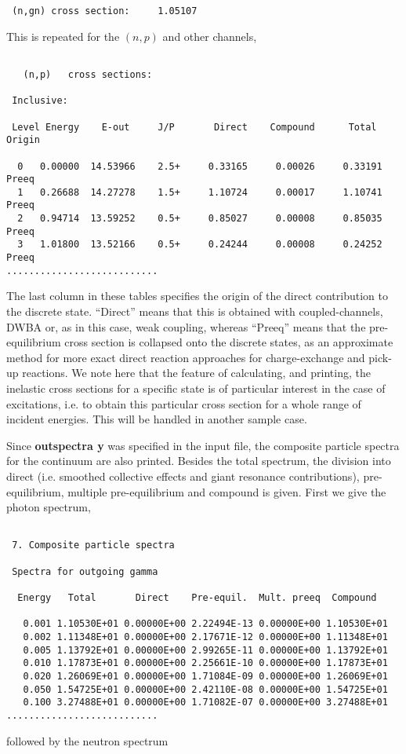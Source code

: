 \begin{samplecase}
{\begin{verbatim}
 (n,gn) cross section:     1.05107
\end{verbatim} } \renewcommand{\baselinestretch}{1.07}\small\normalsize
\noindent
This is repeated for the $(n,p)$ and other channels,

{\small \begin{verbatim}

   (n,p)   cross sections:

 Inclusive:

 Level Energy    E-out     J/P       Direct    Compound      Total     Origin

  0   0.00000  14.53966    2.5+     0.33165     0.00026     0.33191    Preeq
  1   0.26688  14.27278    1.5+     1.10724     0.00017     1.10741    Preeq
  2   0.94714  13.59252    0.5+     0.85027     0.00008     0.85035    Preeq
  3   1.01800  13.52166    0.5+     0.24244     0.00008     0.24252    Preeq
...........................
\end{verbatim} } \renewcommand{\baselinestretch}{1.07}\small\normalsize
\noindent
The last column in these tables specifies the origin of the direct contribution
to the discrete state. ``Direct'' means that this is obtained with 
coupled-channels, DWBA or, as in this case, weak coupling, whereas 
``Preeq'' means that the pre-equilibrium cross section is collapsed onto the 
discrete states, as an approximate method for more exact direct reaction 
approaches for charge-exchange and pick-up reactions.
We note here that the feature of calculating, and printing, the inelastic 
cross sections for a specific state is of particular interest in the case of
excitations, i.e. to obtain this particular cross section for a whole range of
incident energies. This will be handled in another sample case.

Since {\bf outspectra y} was specified in the input file, the composite
particle spectra for the continuum are also printed. Besides the total 
spectrum, the division into 
direct (i.e. smoothed collective effects and giant resonance contributions), 
pre-equilibrium, multiple pre-equilibrium and compound is given. First we give 
the photon spectrum,

{\small \begin{verbatim}

 7. Composite particle spectra
 
 Spectra for outgoing gamma
  
  Energy   Total       Direct    Pre-equil.  Mult. preeq  Compound
  
   0.001 1.10530E+01 0.00000E+00 2.22494E-13 0.00000E+00 1.10530E+01   
   0.002 1.11348E+01 0.00000E+00 2.17671E-12 0.00000E+00 1.11348E+01   
   0.005 1.13792E+01 0.00000E+00 2.99265E-11 0.00000E+00 1.13792E+01   
   0.010 1.17873E+01 0.00000E+00 2.25661E-10 0.00000E+00 1.17873E+01
   0.020 1.26069E+01 0.00000E+00 1.71084E-09 0.00000E+00 1.26069E+01
   0.050 1.54725E+01 0.00000E+00 2.42110E-08 0.00000E+00 1.54725E+01
   0.100 3.27488E+01 0.00000E+00 1.71082E-07 0.00000E+00 3.27488E+01
...........................
\end{verbatim} } \renewcommand{\baselinestretch}{1.07}\small\normalsize
\noindent
followed by the neutron spectrum


\end{samplecase}

